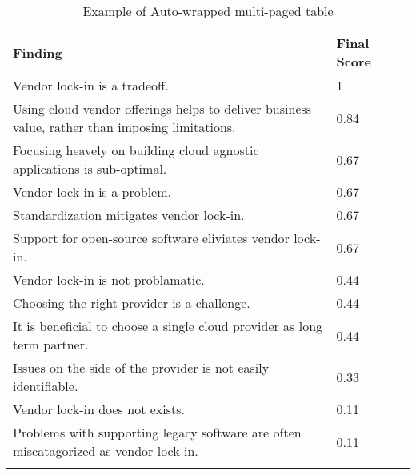 
\renewcommand\arraystretch{1.5}%
\begin{longtable}{|p{10cm}|p{2cm}|p{2cm}|}
\hline
\textbf{Finding} & \textbf{Final Score} \\ \hline
\endhead
Vendor lock-in is a tradeoff. & 1 \\ \hline
Using cloud vendor offerings helps to deliver business value, rather than imposing limitations. & 0.84 \\ \hline
Focusing heavely on building cloud agnostic applications is sub-optimal. & 0.67 \\ \hline
Vendor lock-in is a problem. & 0.67 \\ \hline
Standardization mitigates vendor lock-in. & 0.67 \\ \hline
Support for open-source software eliviates vendor lock-in. & 0.67 \\ \hline
Vendor lock-in is not problamatic. & 0.44 \\ \hline
Choosing the right provider is a challenge. & 0.44 \\ \hline
It is beneficial to choose a single cloud provider as long term partner. & 0.44 \\ \hline
Issues on the side of the provider is not easily identifiable. & 0.33 \\ \hline
Vendor lock-in does not exists. & 0.11 \\ \hline
Problems with supporting legacy software are often miscatagorized as vendor lock-in. & 0.11 \\ \hline
\caption{Example of Auto-wrapped multi-paged table}
\label{tab:table1}
\end{longtable}
